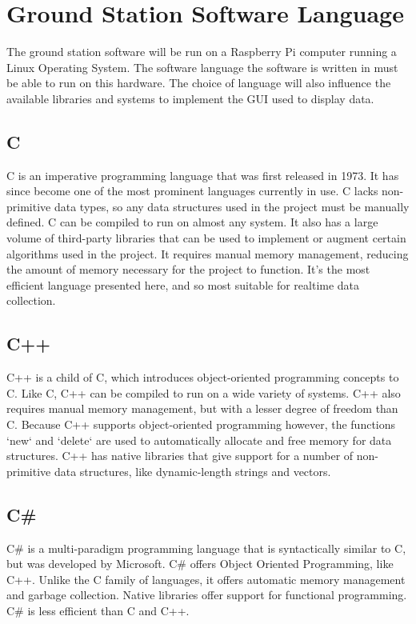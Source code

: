 \documentclass[onecolumn, draftclsnofoot,10pt, compsoc]{IEEEtran}
\begin{document}

	\newpage
		
	\section{Ground Station Software Language}
		\noindent
		The ground station software will be run on a Raspberry Pi computer running a Linux Operating System.
		The software language the software is written in must be able to run on this hardware.
		The choice of language will also influence the available libraries and systems to implement the GUI used to display data.
		
		\subsection{C}
			\noindent
			C is an imperative programming language that was first released in 1973\cite{C-origins}. 
			It has since become one of the most prominent languages currently in use. 
			C lacks non-primitive data types, so any data structures used in the project must be manually defined.
			C can be compiled to run on almost any system. 
			It also has a large volume of third-party libraries that can be used to implement or augment certain algorithms used in the project.
			It requires manual memory management, reducing the amount of memory necessary for the project to function.
			It's the most efficient language presented here, and so most suitable for realtime data collection.
		
		\subsection{C++}
			\noindent
			C++ is a child of C, which introduces object-oriented programming concepts to C.
			Like C, C++ can be compiled to run on a wide variety of systems.
			C++ also requires manual memory management, but with a lesser degree of freedom than C.
			Because C++ supports object-oriented programming however, the functions `new` and `delete` are used to automatically allocate and free memory for data structures.
			C++ has native libraries that give support for a number of non-primitive data structures, like dynamic-length strings and vectors.
		
		\subsection{C\#}
			\noindent
			C\#\cite{C-sharp} is a multi-paradigm programming language that is syntactically similar to C, but was developed by Microsoft.
			C\# offers Object Oriented Programming, like C++.
			Unlike the C family of languages, it offers automatic memory management and garbage collection.
			Native libraries offer support for functional programming.
			C\# is less efficient than C and C++.
		
\end{document}
